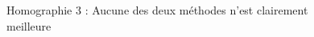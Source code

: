 \begin{figure}
\caption{Homographie 3 : Aucune des deux méthodes n'est clairement meilleure}
\label{Homo3}
\end{figure}

